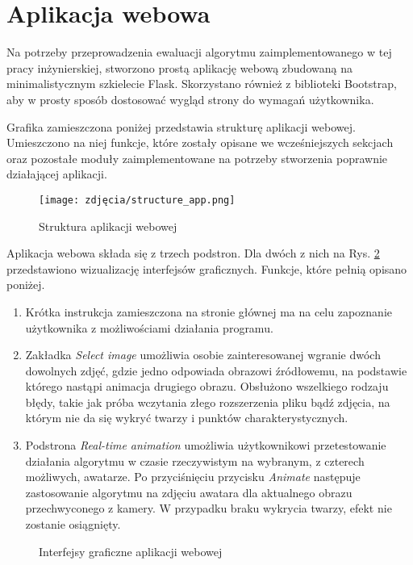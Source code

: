 \newpage

\section{Aplikacja webowa}
Na potrzeby przeprowadzenia ewaluacji algorytmu zaimplementowanego w tej pracy inżynierskiej, stworzono prostą aplikację webową zbudowaną na minimalistycznym szkielecie Flask. Skorzystano również z biblioteki Bootstrap, aby w prosty sposób dostosować wygląd strony do wymagań użytkownika.

Grafika zamieszczona poniżej przedstawia strukturę aplikacji webowej. Umieszczono na niej funkcje, które zostały opisane we wcześniejszych sekcjach oraz pozostałe moduły zaimplementowane na potrzeby stworzenia poprawnie działającej aplikacji.

\begin{figure}[h]
	\centering
	\texttt{[image: zdjęcia/structure\_app.png]}
	\caption{Struktura aplikacji webowej} 
	\label{fig:structureApp}
\end{figure}

Aplikacja webowa składa się z trzech podstron. Dla dwóch z nich na Rys. \ref{fig:app} przedstawiono wizualizację interfejsów graficznych. Funkcje, które pełnią opisano poniżej.

\begin{enumerate}
    \item Krótka instrukcja zamieszczona na stronie głównej ma na celu zapoznanie użytkownika z możliwościami działania programu.
    \item Zakładka \textit{Select image} umożliwia osobie zainteresowanej wgranie dwóch dowolnych zdjęć, gdzie jedno odpowiada obrazowi źródłowemu, na podstawie którego nastąpi animacja drugiego obrazu. Obsłużono wszelkiego rodzaju błędy, takie jak próba wczytania złego rozszerzenia pliku bądź zdjęcia, na którym nie da się wykryć twarzy i punktów charakterystycznych.
    \item Podstrona \textit{Real-time animation} umożliwia użytkownikowi przetestowanie działania algorytmu w czasie rzeczywistym na wybranym, z czterech możliwych, awatarze. Po przyciśnięciu przycisku \textit{Animate} następuje zastosowanie algorytmu na zdjęciu awatara dla aktualnego obrazu przechwyconego z kamery. W przypadku braku wykrycia twarzy, efekt nie zostanie osiągnięty.
\end{enumerate}

\begin{figure}[h]
	\centering
	\quad
	\caption{\label{fig:app}Interfejsy graficzne aplikacji webowej}
\end{figure}


